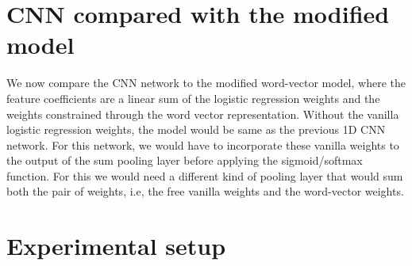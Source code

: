 








\section{CNN compared with the modified model}

We now compare the CNN network to the modified word-vector model, where the feature coefficients are a linear sum of the logistic regression weights and the weights constrained through the word vector representation. Without the vanilla logistic regression weights, the model would be same as the previous 1D CNN network. For this network, we would have to incorporate these vanilla weights to the output of the sum pooling layer before applying the sigmoid/softmax function. For this we would need a different kind of pooling layer that would sum both the pair of weights, i.e, the free vanilla weights and the word-vector weights.

\section{Experimental setup}
